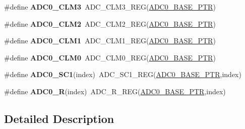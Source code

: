 \begin{DoxyCompactItemize}
\mbox{\label{group___a_d_c___register___accessor___macros_ga6efa6484d9396467ad0c2b3b9583cdd7}} 
\#define {\bfseries A\+D\+C0\+\_\+\+C\+L\+M3}~A\+D\+C\+\_\+\+C\+L\+M3\+\_\+\+R\+EG(\hyperlink{group___a_d_c___peripheral_ga6cec2f227a3a37a9fccaa830740f1f5e}{A\+D\+C0\+\_\+\+B\+A\+S\+E\+\_\+\+P\+TR})
\item 
\mbox{\label{group___a_d_c___register___accessor___macros_ga5e13c2498b80a3492922e32d88d35079}} 
\#define {\bfseries A\+D\+C0\+\_\+\+C\+L\+M2}~A\+D\+C\+\_\+\+C\+L\+M2\+\_\+\+R\+EG(\hyperlink{group___a_d_c___peripheral_ga6cec2f227a3a37a9fccaa830740f1f5e}{A\+D\+C0\+\_\+\+B\+A\+S\+E\+\_\+\+P\+TR})
\item 
\mbox{\label{group___a_d_c___register___accessor___macros_ga18d9c7c3d402716526d6f90bcbe1811a}} 
\#define {\bfseries A\+D\+C0\+\_\+\+C\+L\+M1}~A\+D\+C\+\_\+\+C\+L\+M1\+\_\+\+R\+EG(\hyperlink{group___a_d_c___peripheral_ga6cec2f227a3a37a9fccaa830740f1f5e}{A\+D\+C0\+\_\+\+B\+A\+S\+E\+\_\+\+P\+TR})
\item 
\mbox{\label{group___a_d_c___register___accessor___macros_ga5dca3dc10fac37b7fc668a9664da1607}} 
\#define {\bfseries A\+D\+C0\+\_\+\+C\+L\+M0}~A\+D\+C\+\_\+\+C\+L\+M0\+\_\+\+R\+EG(\hyperlink{group___a_d_c___peripheral_ga6cec2f227a3a37a9fccaa830740f1f5e}{A\+D\+C0\+\_\+\+B\+A\+S\+E\+\_\+\+P\+TR})
\item 
\mbox{\label{group___a_d_c___register___accessor___macros_ga74e1388b9008043dfffab26709577f14}} 
\#define {\bfseries A\+D\+C0\+\_\+\+S\+C1}(index)~A\+D\+C\+\_\+\+S\+C1\+\_\+\+R\+EG(\hyperlink{group___a_d_c___peripheral_ga6cec2f227a3a37a9fccaa830740f1f5e}{A\+D\+C0\+\_\+\+B\+A\+S\+E\+\_\+\+P\+TR},index)
\item 
\mbox{\label{group___a_d_c___register___accessor___macros_ga6e68bb0b85f28213a274b53aa8ddfc36}} 
\#define {\bfseries A\+D\+C0\+\_\+R}(index)~A\+D\+C\+\_\+\+R\+\_\+\+R\+EG(\hyperlink{group___a_d_c___peripheral_ga6cec2f227a3a37a9fccaa830740f1f5e}{A\+D\+C0\+\_\+\+B\+A\+S\+E\+\_\+\+P\+TR},index)
\end{DoxyCompactItemize}


\subsection{Detailed Description}
